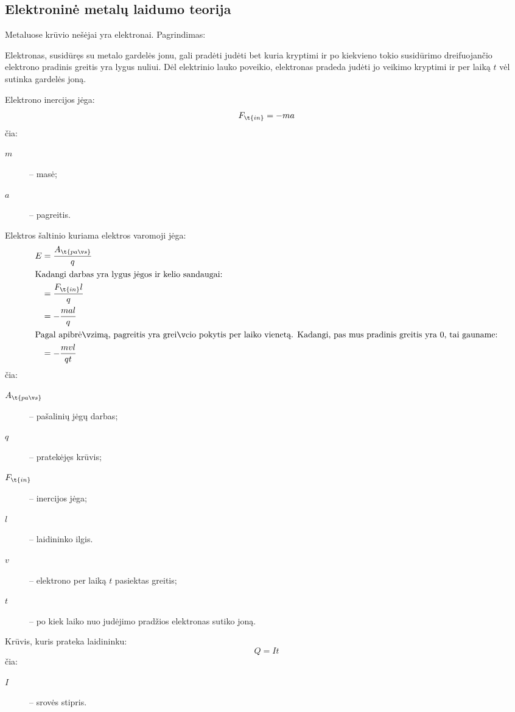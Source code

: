 \subsection{Elektroninė metalų laidumo teorija}

Metaluose krūvio nešėjai yra elektronai. Pagrindimas: 

Elektronas, susidūręs su metalo gardelės jonu, gali pradėti judėti
bet kuria kryptimi ir po kiekvieno tokio susidūrimo dreifuojančio
elektrono pradinis greitis yra lygus nuliui. Dėl elektrinio lauko
poveikio, elektronas pradeda judėti jo veikimo kryptimi ir per laiką
$t$ vėl sutinka gardelės joną.

Elektrono inercijos jėga:
\begin{equation*}
  F_{\t{in}} = -ma
\end{equation*}
čia:
\begin{description}
  \item[$m$] – masė;
  \item[$a$] – pagreitis.
\end{description}

Elektros šaltinio kuriama elektros varomoji jėga:
\begin{align}
  E &= \frac{A_{\t{paš}}}{q} \\
  \intertext{Kadangi darbas yra lygus jėgos ir kelio sandaugai:}
  &= \frac{F_{\t{in}} l}{q} \\
  &= -\frac{mal}{q} \\
  \intertext{Pagal apibrėžimą, pagreitis yra greičio pokytis per laiko
  vienetą. Kadangi, pas mus pradinis greitis yra 0, tai gauname:}
  &= -\frac{mvl}{qt} \label{eq:metalu_laidumo_1} \\
\end{align}
čia:
\begin{description}
  \item[$A_{\t{paš}}$] – pašalinių jėgų darbas;
  \item[$q$] – pratekėjęs krūvis;
  \item[$F_{\t{in}}$] – inercijos jėga;
  \item[$l$] – laidininko ilgis.
  \item[$v$] – elektrono per laiką $t$ pasiektas greitis;
  \item[$t$] – po kiek laiko nuo judėjimo pradžios elektronas sutiko
    joną.
\end{description}

Krūvis, kuris prateka laidininku:
\begin{equation}
  Q = I t \label{eq:metalu_laidumo_3}
\end{equation}
čia:
\begin{description}
  \item[$I$] – srovės stipris.
\end{description}

